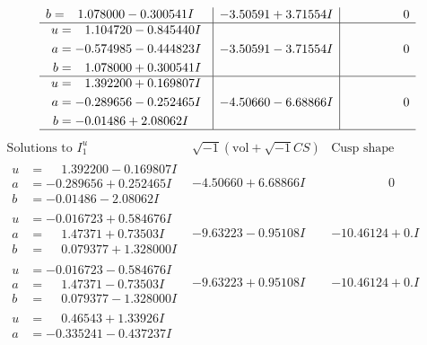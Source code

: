 \documentclass[1p]{elsarticle_modified}
\theoremstyle{definition}
\newcommand{\I}{\sqrt{-1}}
\begin{document}
$$\begin{array}{c|c|c}
\begin{aligned}
b &= \phantom{-}1.078000 - 0.300541 I\end{aligned}
 & -3.50591 + 3.71554 I & \phantom{-0.000000 } 0 \\ \hline\begin{aligned}
u &= \phantom{-}1.104720 - 0.845440 I \\
a &= -0.574985 - 0.444823 I \\
b &= \phantom{-}1.078000 + 0.300541 I\end{aligned}
 & -3.50591 - 3.71554 I & \phantom{-0.000000 } 0 \\ \hline\begin{aligned}
u &= \phantom{-}1.392200 + 0.169807 I \\
a &= -0.289656 - 0.252465 I \\
b &= -0.01486 + 2.08062 I\end{aligned}
 & -4.50660 - 6.68866 I & \phantom{-0.000000 } 0\\
 \hline 
 \end{array}$$\newpage$$\begin{array}{c|c|c}  
\text{Solutions to }I^u_{1}& \I (\text{vol} + \sqrt{-1}CS) & \text{Cusp shape}\\
 \hline 
\begin{aligned}
u &= \phantom{-}1.392200 - 0.169807 I \\
a &= -0.289656 + 0.252465 I \\
b &= -0.01486 - 2.08062 I\end{aligned}
 & -4.50660 + 6.68866 I & \phantom{-0.000000 } 0 \\ \hline\begin{aligned}
u &= -0.016723 + 0.584676 I \\
a &= \phantom{-}1.47371 + 0.73503 I \\
b &= \phantom{-}0.079377 + 1.328000 I\end{aligned}
 & -9.63223 - 0.95108 I & -10.46124 + 0. I\phantom{ +0.000000I} \\ \hline\begin{aligned}
u &= -0.016723 - 0.584676 I \\
a &= \phantom{-}1.47371 - 0.73503 I \\
b &= \phantom{-}0.079377 - 1.328000 I\end{aligned}
 & -9.63223 + 0.95108 I & -10.46124 + 0. I\phantom{ +0.000000I} \\ \hline\begin{aligned}
u &= \phantom{-}0.46543 + 1.33926 I \\
a &= -0.335241 - 0.437237 I \\

\end{aligned}
\end{array}$$
\end{document}
